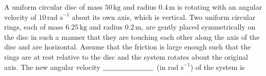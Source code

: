 

    \item A uniform circular disc of mass $50 \, \text{kg}$ and radius $0.4 \, \text{m}$ is rotating with an angular velocity of $10 \, \text{rad s}^{-1}$ about its own axis, which is vertical. Two uniform circular rings, each of mass $6.25 \, \text{kg}$ and radius $0.2 \, \text{m}$, are gently placed symmetrically on the disc in such a manner that they are touching each other along the axis of the disc and are horizontal. Assume that the friction is large enough such that the rings are at rest relative to the disc and the system rotates about the original axis. The new angular velocity $\underline{\hspace{2.5 cm}}$ (in $\text{rad s}^{-1}$) of the system is

